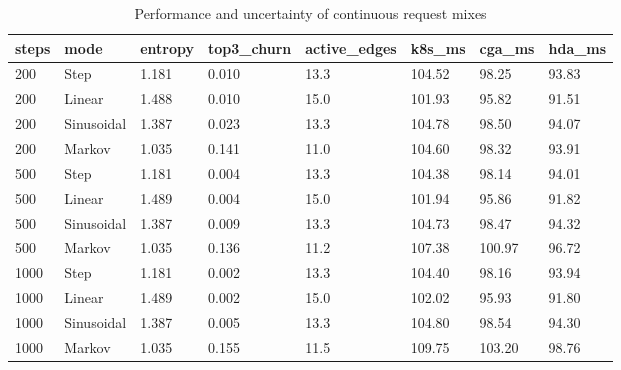 \begin{table}[t]
\centering
\caption{Performance and uncertainty of continuous request mixes}
\label{tab:continuous_longmix_robustness}
\scriptsize
\begin{tabular}{llllllll}
\toprule
steps & mode & entropy & top3\_churn & active\_edges & k8s\_ms & cga\_ms & hda\_ms \\
\midrule
200 & Step & 1.181 & 0.010 & 13.3 & 104.52 & 98.25 & 93.83 \\
200 & Linear & 1.488 & 0.010 & 15.0 & 101.93 & 95.82 & 91.51 \\
200 & Sinusoidal & 1.387 & 0.023 & 13.3 & 104.78 & 98.50 & 94.07 \\
200 & Markov & 1.035 & 0.141 & 11.0 & 104.60 & 98.32 & 93.91 \\
500 & Step & 1.181 & 0.004 & 13.3 & 104.38 & 98.14 & 94.01 \\
500 & Linear & 1.489 & 0.004 & 15.0 & 101.94 & 95.86 & 91.82 \\
500 & Sinusoidal & 1.387 & 0.009 & 13.3 & 104.73 & 98.47 & 94.32 \\
500 & Markov & 1.035 & 0.136 & 11.2 & 107.38 & 100.97 & 96.72 \\
1000 & Step & 1.181 & 0.002 & 13.3 & 104.40 & 98.16 & 93.94 \\
1000 & Linear & 1.489 & 0.002 & 15.0 & 102.02 & 95.93 & 91.80 \\
1000 & Sinusoidal & 1.387 & 0.005 & 13.3 & 104.80 & 98.54 & 94.30 \\
1000 & Markov & 1.035 & 0.155 & 11.5 & 109.75 & 103.20 & 98.76 \\
\bottomrule
\end{tabular}
\end{table}

